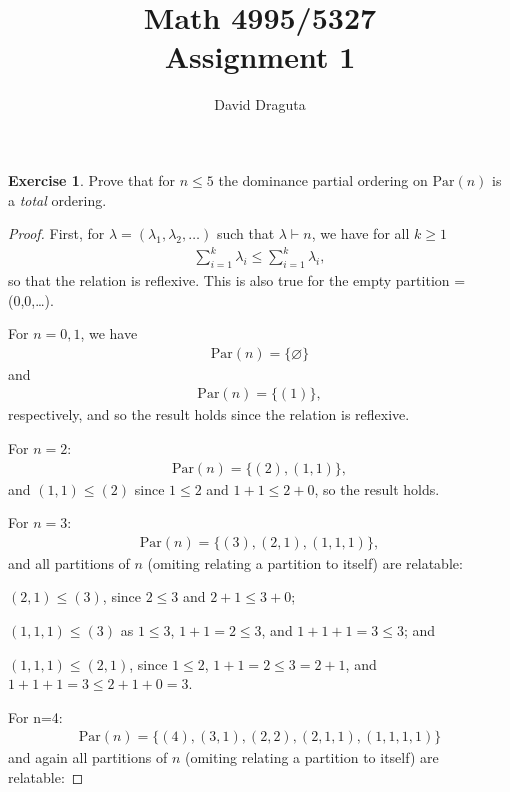 \documentclass[12pt]{extarticle}
\title{ Math 4995/5327
  \\
  Assignment 1}
\author{David Draguta}
\newcommand{\set}[1]{\{#1\}}
\newcommand{\<}{\langle}
\renewcommand{\>}{\rangle}
\renewcommand{\emptyset}{\varnothing}
\theoremstyle{definition}
\newtheorem{exercise}{Exercise}
\begin{document}
\maketitle

\begin{exercise}
  Prove that for $n \leq 5$ the dominance partial ordering on $\text{Par}(n)$ is a \textit{total} ordering. 
\end{exercise}
\begin{proof}
  First, for $\lambda = (\lambda_1, \lambda_2, \dots)$ such that $\lambda \vdash n$, we have for all $k \geq 1$
  \begin{align*}
    \sum\limits_{i=1}^k \lambda_i \leq \sum\limits_{i=1}^k \lambda_i,
  \end{align*}
  so that the relation is reflexive. This is also true for the empty partition \emptyset = (0,0,\dots). 

  For $n=0,1$, we have
  \begin{align*}
    \text{Par}(n) = \set{\emptyset}
  \end{align*}
  and
  \begin{align*}
    \text{Par}(n) = \set{(1)},
  \end{align*}
  respectively, and so the result holds since the relation is reflexive.
  
  For $n=2$:
  \begin{align*}
    \text{Par}(n) = \set{(2), (1,1)},
  \end{align*}
  and $(1,1) \leq (2)$ since $ 1 \leq 2$ and $ 1 + 1 \leq 2 + 0$, so the result holds.
  
  For $n=3$:
  \begin{align*}
    \text{Par}(n) = \set{(3), (2,1), (1,1,1)},
  \end{align*}
  and all partitions of $n$ (omiting relating a partition to itself) are relatable: 

  $(2,1) \leq (3)$, since $2 \leq 3$ and $2 + 1 \leq 3 + 0$;

  $(1,1,1) \leq (3)$ as $ 1 \leq 3$, $1 + 1 =2 \leq 3 $, and $1+1+1 = 3 \leq 3$; and

  $(1,1,1) \leq (2,1)$, since $1 \leq 2$, $1 + 1 = 2 \leq 3 = 2+1$, and $1+1+1=3 \leq 2+1+0 = 3$.

  For n=4:
  \begin{align*}
    \text{Par}(n) = \set{(4), (3,1), (2,2), (2,1,1), (1,1,1,1)}
  \end{align*}
  and again all partitions of $n$ (omiting relating a partition to itself) are relatable:


\end{proof}
\end{document}
